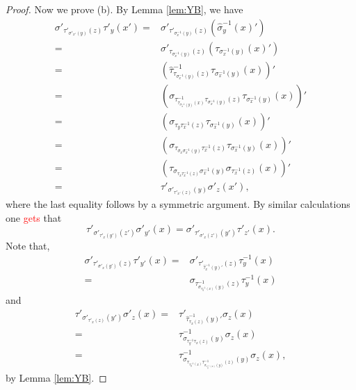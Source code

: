 \begin{proof}
Now we prove (b). By Lemma \ref{lem:YB}, we have
\begin{align*}
    \sigma'_{\tau'_{\sigma'_{x'}(y)}(z)}\tau'_y(x')=&
    \sigma'_{\tau'_{\sigma^{-1}_{x}(y)}(z)}\left(\widehat{\sigma}^{-1}_y(x)'\right)\\
    =&
    \sigma'_{\tau_{\sigma^{-1}_{x}(y)}(z)}\left(\tau_{\sigma^{-1}_x(y)}(x)'\right)\\
    =&
    \left(\widehat{\tau}^{-1}_{\tau_{\sigma^{-1}_{x}(y)}(z)}\tau_{\sigma^{-1}_x(y)}(x)\right)'\\
     =&
    \left(\sigma_{\tau^{-1}_{\tau_{\sigma^{-1}_x(y)}(x)}\tau_{\sigma^{-1}_{x}(y)}(z)}\tau_{\sigma^{-1}_x(y)}(x)\right)'\\
    =&
    \left(\sigma_{\tau_{y}\tau^{-1}_{x}(z)}\tau_{\sigma^{-1}_x(y)}(x)\right)'\\
    =&
    \left(\sigma_{\tau_{\sigma_x\sigma^{-1}_x(y)}\tau^{-1}_{x}(z)}\tau_{\sigma^{-1}_x(y)}(x)\right)'\\
    =&
    \left(\tau_{\sigma_{\tau_x\tau^{-1}_x(z)}\sigma^{-1}_{x}(y)}\sigma_{\tau^{-1}_x(z)}(x)\right)'\\
    =&\tau'_{\sigma'_{\tau'_{x'}(z)}(y)}\sigma'_z(x'),
\end{align*}
where the last equality follows by a symmetric argument. By similar calculations one \textcolor{red}{gets} that
\[\tau'_{\sigma'_{\tau'_x(y')}(z')}\sigma'_{y'}(x)=\sigma'_{\tau'_{\sigma'_x(z')}(y')}\tau'_{z'}(x).\]
Note that, 
\begin{align*}
    \sigma'_{\tau'_{\sigma'_x(y')}(z)}\tau'_{y'}(x)=&\sigma'_{\tau'_{\widehat{\tau}^{-1}_x(y)'}(z)}\tau^{-1}_y(x)\\
    =&\sigma_{\tau^{-1}_{\sigma_{\tau^{-1}_y(x)}(y)}(z)}\tau^{-1}_y(x)
\end{align*}
and
\begin{align*}
    \tau'_{\sigma'_{\tau'_x(z)}(y')}\sigma'_{z}(x)
    =&\tau'_{\widehat{\tau}^{-1}_{\tau_x(z)}(y)'}\sigma_z(x)\\
    =&\tau^{-1}_{\sigma_{\tau^{-1}_y\tau_x(z)}(y)}\sigma_z(x)\\
    =&\tau^{-1}_{\sigma_{\tau_{\tau^{-1}_y(x)}\tau^{-1}_{\sigma_{\tau^{-1}_y(x)}(y)}(z)}(y)}\sigma_z(x),
\end{align*}
by Lemma \ref{lem:YB}.


\end{proof}
